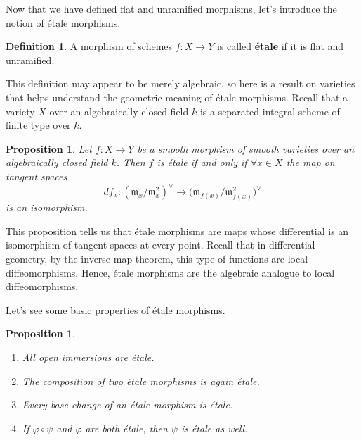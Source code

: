 \documentclass{report}
\newtheorem{proposition}[equation]{Proposition}
\theoremstyle{definition}
\newtheorem{definition}[equation]{Definition}
\begin{document}
Now that we have defined flat and unramified morphisms, let's introduce the notion of \'{e}tale morphisms.

\begin{definition}
A morphism of schemes $f:X\rightarrow Y$ is called \textbf{\'{e}tale} if it is flat and unramified.
\end{definition}

This definition may appear to be merely algebraic, so here is a result on varieties that helps understand the geometric meaning of \'{e}tale morphisms. Recall that a variety $X$ over an algebraically closed field $k$ is a separated integral scheme of finite type over $k$.

\begin{proposition}
Let $f:X\rightarrow Y$ be a smooth morphism of smooth varieties over an algebraically closed field $k$. Then $f$ is \'{e}tale if and only if $\forall x\in X$ the map on tangent spaces
\[df_x:(\mathfrak{m}_x/\mathfrak{m}_x^2)^{\vee}\longrightarrow\big(\mathfrak{m}_{f(x)}/\mathfrak{m}_{f(x)}^2\big)^{\vee}\]
is an isomorphism.
\end{proposition}

This proposition tells us that \'{e}tale morphisms are maps whose differential is an isomorphism of tangent spaces at every point. Recall that in differential geometry, by the inverse map theorem, this type of functions are local diffeomorphisms. Hence, \'{e}tale morphisms are the algebraic analogue to local diffeomorphisms.

Let's see some basic properties of \'{e}tale morphisms.

\begin{proposition}
\label{Pro:etale_properties}
\begin{enumerate}
\item\label{Pro:etale_properties:immersion} All open immersions are \'{e}tale.

\item The composition of two \'{e}tale morphisms is again \'{e}tale.

\item Every base change of an \'{e}tale morphism is \'{e}tale.

\item\label{Pro:etale_properties:component} If $\varphi\circ\psi$ and $\varphi$ are both \'{e}tale, then $\psi$ is \'{e}tale as well.
\end{enumerate}
\end{proposition}
\end{document}
